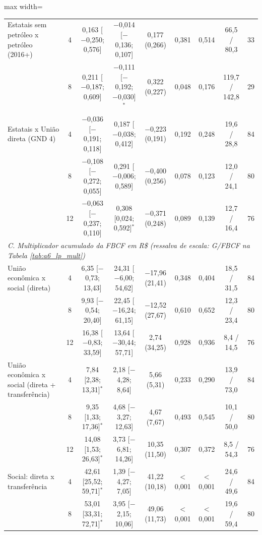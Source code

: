 \begin{table}[htbp]
\begin{adjustbox}{max width=\linewidth}
\begin{tabular}{p{3.4cm}cccccccc}
Estatais sem petr\'oleo x petr\'oleo (2016+) & 4 & 0{,}163 [$-$0{,}250; 0{,}576] & $-$0{,}014 [$-$0{,}136; 0{,}107] & 0{,}177 (0{,}266) & 0{,}381 & 0{,}514 & 66{,}5 / 80{,}3 & 33 \\
 & 8 & 0{,}211 [$-$0{,}187; 0{,}609] & $-$0{,}111 [$-$0{,}192; $-$0{,}030]$^{*}$ & 0{,}322 (0{,}227) & 0{,}048 & 0{,}176 & 119{,}7 / 142{,}8 & 29 \\
Estatais x Uni\~ao direta (GND 4) & 4 & $-$0{,}036 [$-$0{,}191; 0{,}118] & 0{,}187 [$-$0{,}038; 0{,}412] & $-$0{,}223 (0{,}191) & 0{,}192 & 0{,}248 & 19{,}6 / 28{,}8 & 84 \\
 & 8 & $-$0{,}108 [$-$0{,}272; 0{,}055] & 0{,}291 [$-$0{,}006; 0{,}589] & $-$0{,}400 (0{,}256) & 0{,}078 & 0{,}123 & 12{,}0 / 24{,}1 & 80 \\
 & 12 & $-$0{,}063 [$-$0{,}237; 0{,}110] & 0{,}308 [0{,}024; 0{,}592]$^{*}$ & $-$0{,}371 (0{,}248) & 0{,}089 & 0{,}139 & 12{,}7 / 16{,}4 & 76 \\
\multicolumn{9}{l}{\textit{C. Multiplicador acumulado da FBCF em R\$ (ressalva de escala: G/FBCF na Tabela \ref{tab:a6_lp_mult})}} \\
Uni\~ao econ\^omica x social (direta) & 4 & 6{,}35 [$-$0{,}73; 13{,}43] & 24{,}31 [$-$6{,}00; 54{,}62] & $-$17{,}96 (21{,}41) & 0{,}348 & 0{,}404 & 18{,}5 / 31{,}5 & 84 \\
 & 8 & 9{,}93 [$-$0{,}54; 20{,}40] & 22{,}45 [$-$16{,}24; 61{,}15] & $-$12{,}52 (27{,}67) & 0{,}610 & 0{,}652 & 12{,}3 / 23{,}4 & 80 \\
 & 12 & 16{,}38 [$-$0{,}83; 33{,}59] & 13{,}64 [$-$30{,}44; 57{,}71] & 2{,}74 (34{,}25) & 0{,}928 & 0{,}936 & 8{,}4 / 14{,}5 & 76 \\
Uni\~ao econ\^omica x social (direta + transfer\^encia) & 4 & 7{,}84 [2{,}38; 13{,}31]$^{*}$ & 2{,}18 [$-$4{,}28; 8{,}64] & 5{,}66 (5{,}31) & 0{,}233 & 0{,}290 & 13{,}9 / 73{,}0 & 84 \\
 & 8 & 9{,}35 [1{,}33; 17{,}36]$^{*}$ & 4{,}68 [$-$3{,}27; 12{,}63] & 4{,}67 (7{,}67) & 0{,}493 & 0{,}545 & 10{,}1 / 50{,}0 & 80 \\
 & 12 & 14{,}08 [1{,}53; 26{,}63]$^{*}$ & 3{,}73 [$-$6{,}81; 14{,}26] & 10{,}35 (11{,}50) & 0{,}307 & 0{,}372 & 8{,}5 / 54{,}3 & 76 \\
Social: direta x transfer\^encia & 4 & 42{,}61 [25{,}52; 59{,}71]$^{*}$ & 1{,}39 [$-$4{,}27; 7{,}05] & 41{,}22 (10{,}18) & $<$0{,}001 & $<$0{,}001 & 24{,}6 / 49{,}6 & 84 \\
 & 8 & 53{,}01 [33{,}31; 72{,}71]$^{*}$ & 3{,}95 [$-$2{,}15; 10{,}06] & 49{,}06 (11{,}73) & $<$0{,}001 & $<$0{,}001 & 19{,}6 / 59{,}4 & 80 \\

\end{tabular}
\end{adjustbox}
\end{table}
